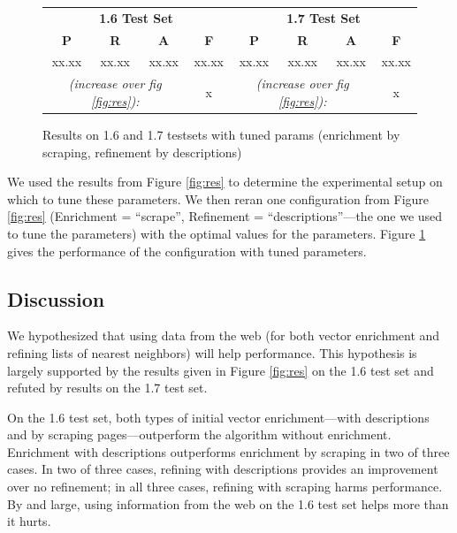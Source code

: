 \documentclass{article}
\begin{document}
\begin{figure}[hbtp]
\begin{center}
\begin{tabular}{|c|c|c|c||c|c|c|c|}
\hline
  \multicolumn{4}{|c||}{{\bf 1.6 Test Set}} & \multicolumn{4}{c|}{{\bf 1.7 Test Set}}  \\
  {\bf P} & {\bf R} & {\bf A} & {\bf F} & {\bf P} & {\bf R} & {\bf A} & {\bf F} \\
\hline \hline
xx.xx & xx.xx & xx.xx & xx.xx & xx.xx & xx.xx & xx.xx & xx.xx \\
\hline
\multicolumn{3}{|c|}{{\it (increase over fig \ref{fig:res}):}} & x & \multicolumn{3}{c|}{{\it (increase over fig \ref{fig:res}):}}  & x  \\
\hline
\end{tabular}
\caption{Results on 1.6 and 1.7 testsets with tuned params (enrichment by scraping, refinement by descriptions)}
\label{fig:tunedres}
\end{center}
\end{figure}
We used the results from Figure \ref{fig:res} to determine the experimental setup on which to tune these parameters.
We then reran one configuration from Figure \ref{fig:res} (Enrichment = ``scrape'', Refinement = ``descriptions''---the one we used to tune the parameters) with the optimal values for the parameters.
Figure \ref{fig:tunedres} gives the performance of the configuration with tuned parameters.


\subsection{Discussion}


We hypothesized that using data from the web (for both vector enrichment and refining lists of nearest neighbors) will help performance.
This hypothesis is largely supported by the results given in Figure \ref{fig:res} on the 1.6 test set and refuted by results on the 1.7 test set.

On the 1.6 test set, both types of initial vector enrichment---with descriptions and by scraping pages---outperform the algorithm without enrichment.
Enrichment with descriptions outperforms enrichment by scraping in two of three cases.
In two of three cases, refining with descriptions provides an improvement over no refinement; in all three cases, refining with scraping harms performance.
By and large, using information from the web on the 1.6 test set helps more than it hurts.
\end{document}
